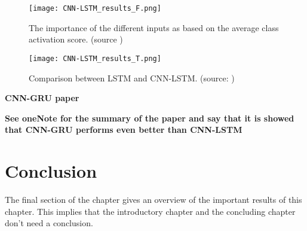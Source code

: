 \begin{figure}[h!]
	\centering
	\texttt{[image: CNN-LSTM\_results\_F.png]}
	\caption{The importance of the different inputs as based on the average class activation score. (source \cite{Kim2019})}
	\label{tab:LSTM_lit_results}
\end{figure}

\begin{figure}[h!]
	\centering
	\texttt{[image: CNN-LSTM\_results\_T.png]}
	\caption{Comparison between LSTM and CNN-LSTM. (source: \cite{Kim2019})}
	\label{tab:LSTM_lit_results}
\end{figure}

\textbf{CNN-GRU paper}\\
\cite{Sajjad2020}

\textbf{See oneNote for the summary of the paper and say that it is showed that CNN-GRU performs even better than CNN-LSTM}


%



\section{Conclusion}
The final section of the chapter gives an overview of the important results
of this chapter. This implies that the introductory chapter and the
concluding chapter don't need a conclusion.



